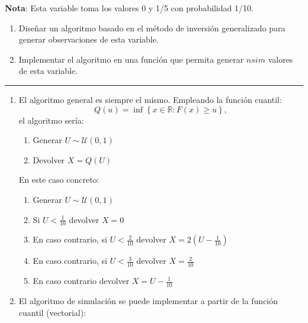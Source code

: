 \documentclass[
]{book}
\theoremstyle{break}
\theoremstyle{nonumberplain}
\begin{document}
\textbf{Nota}: Esta variable toma los valores 0 y 1/5 con probabilidad 1/10.

\begin{enumerate}
\def\labelenumi{\alph{enumi})}
\item
  Diseñar un algoritmo basado en el método de inversión generalizado
  para generar observaciones de esta variable.
\item
  Implementar el algoritmo en una función que permita generar \(nsim\)
  valores de esta variable.
\end{enumerate}

\begin{center}\rule{0.5\linewidth}{0.5pt}\end{center}

\begin{enumerate}
\def\labelenumi{\alph{enumi})}
\item
  El algoritmo general es siempre el mismo. Empleando la función cuantil:
  \[Q\left( u\right) = \inf \left\{ x\in \mathbb{R}:F\left( x\right) 
  \geq u\right\},\]
  el algoritmo sería:

  \begin{enumerate}
  \def\labelenumii{\arabic{enumii}.}
  \item
    Generar \(U\sim \mathcal{U}\left( 0,1\right)\)
  \item
    Devolver \(X=Q\left( U\right)\)
  \end{enumerate}

  En este caso concreto:

  \begin{enumerate}
  \def\labelenumii{\arabic{enumii}.}
  \item
    Generar \(U\sim \mathcal{U}\left( 0,1\right)\)
  \item
    Si \(U < \frac{1}{10}\) devolver \(X = 0\)
  \item
    En caso contrario, si \(U < \frac{2}{10}\) devolver \(X = 2(U - \frac{1}{10})\)
  \item
    En caso contrario, si \(U < \frac{3}{10}\) devolver \(X = \frac{2}{10}\)
  \item
    En caso contrario devolver \(X = U - \frac{1}{10}\)
  \end{enumerate}
\item
  El algoritmo de simulación se puede implementar a partir de la función cuantil
  (vectorial):


\end{enumerate}
\end{document}
